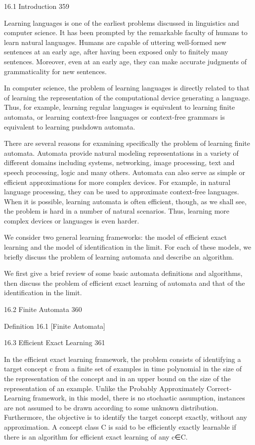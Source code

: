 16.1 Introduction 359

Learning languages is one of the earliest problems discussed in linguistics and computer science. It has been prompted by the remarkable faculty of humans to learn natural languages. Humans are capable of uttering well-formed new sentences at an early age, after having been exposed only to finitely many sentences. Moreover, even at an early age, they can make accurate judgments of grammaticality for new sentences.

In computer science, the problem of learning languages is directly related to that of learning the representation of the computational device generating a language. Thus, for example, learning regular languages is equivalent to learning finite automata, or learning context-free languages or context-free grammars is equivalent to learning pushdown automata.

There are several reasons for examining specifically the problem of learning finite automata. Automata provide natural modeling representations in a variety of different domains including systems, networking, image processing, text and speech processing, logic and many others. Automata can also serve as simple or efficient approximations for more complex devices. For example, in natural language processing, they can be used to approximate context-free languages. When it is possible, learning automata is often efficient, though, as we shall see, the problem is hard in a number of natural scenarios. Thus, learning more complex devices or languages is even harder.

We consider two general learning frameworks: the model of efficient exact learning and the model of identification in the limit. For each of these models, we briefly discuss the problem of learning automata and describe an algorithm.

We first give a brief review of some basic automata definitions and algorithms, then discuss the problem of efficient exact learning of automata and that of the identification in the limit.

16.2 Finite Automata 360

Definition 16.1 [Finite Automata]

16.3 Efficient Exact Learning 361

In the efficient exact learning framework, the problem consists of identifying a target concept c from a finite set of examples in time polynomial in the size of the representation of the concept and in an upper bound on the size of the representation of an example. Unlike the Probably Approximately Correct-Learning framework, in this model, there is no stochastic assumption, instances are not assumed to be drawn according to some unknown distribution. Furthermore, the objective is to identify the target concept exactly, without any approximation. A concept class C is said to be efficiently exactly learnable if there is an algorithm for efficient exact learning of any c∈C.

